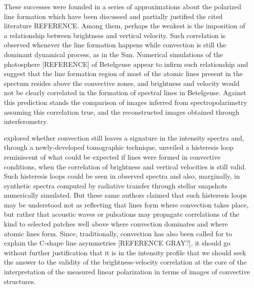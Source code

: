 \documentclass{/Users/art2/TeX/aanda/aa}
\begin{document}
These successes were founded in a series of approximations about the polarized line formation which have been discussed and partially justified  the cited literature {REFERENCE}. Among them, perhaps the weakest is the imposition of a relationship between brightness and vertical velocity. Such correlation 
is observed whenever the line formation happens while convection is still the dominant dynamical process, as in the Sun. Numerical simulations of the 
photosphere [REFERENCE] of Betelgeuse appear to infirm such relationship and suggest that the line formation region of most of the atomic lines present in 
the spectum resides above the convective zones, and brightness 
and velocity would not be clearly correlated in the formation of spectral lines in Betelgeuse. Against this prediction stands the comparison of 
images inferred from spectropolarimetry assuming this correlation true, and the reconstructed images obtained through interferometry. 

\cite{kravchenko_tomography_2018} explored whether convection still leaves a signature in the intensity spectra and, through a newly-developed tomographic technique, unveiled 
a histeresis loop reminiscent of what could be expected if lines were formed in convective conditions, when the correlation of brightness and 
vertical velocities is still valid. Such histeresis loops could be seen in observed spectra and also, marginally, in synthetic spectra computed 
by radiative transfer through stellar snapshots  numerically simulated. But these same authors claimed that such histeresis loops may be understood 
not as reflecting that lines form where convection takes place, but rather that acoustic waves or pulsations may propagate correlations of the 
kind to selected patches well above where convection dominates and where atomic lines form. 
Since, traditionally, convection has also been called for to explain the C-shape line asymmetries [REFERENCE GRAY?], it should go without further justification that 
it is in the intensity profile that we should seek the answer to the validity of the brightness-velocity correlation at the core of the interpretation
of the measured linear polarization in terms of images of convective structures. 
\end{document}
